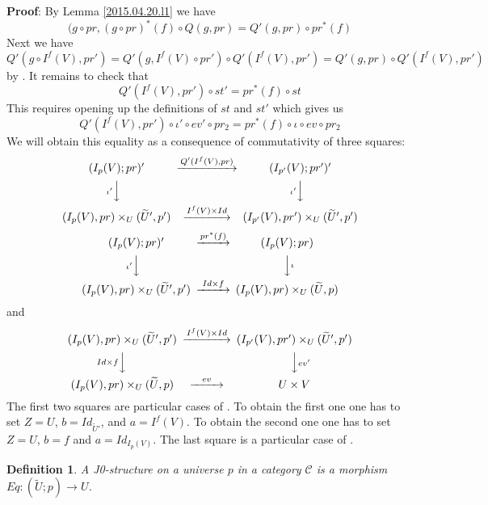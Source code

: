 \documentclass[12pt]{article}
\newenvironment{myproof}{{\bf Proof}:}{\vskip 5mm }
\newtheorem{definition}[proposition]{Definition}
\newcommand{\llabel}[1]{\label{#1}}
\newcommand{\sr}{\rightarrow}
\newcommand{\wt}{\widetilde}
\begin{document}
\begin{myproof}
By Lemma \ref{2015.04.20.l1} we have 
%
$$(g\circ pr, (g\circ pr)^*(f)\circ Q(g,pr)=Q'(g,pr)\circ pr^*(f)$$
%
Next we have
%
$$Q'(g\circ I^f(V), pr')=Q'(g,I^f(V)\circ pr')\circ Q'(I^f(V),pr')=Q'(g,pr)\circ Q'(I^f(V),pr')$$
%
by \cite[Lemma 3.2]{fromunivwithPi}. It remains to check that
%
$$Q'(I^f(V),pr')\circ st'=pr^*(f)\circ st$$
%
This requires opening up the definitions of $st$ and $st'$ which gives us
%
$$Q'(I^f(V),pr')\circ \iota'\circ ev'\circ pr_2=pr^*(f)\circ \iota\circ ev\circ pr_2$$
%
We will obtain this equality as a consequence of commutativity of three squares:
%
$$
\begin{CD}
(I_p(V);pr)' @>Q'(I^f(V),pr)>> (I_{p'}(V);pr')'\\
@V\iota' VV @V\iota' VV\\
(I_p(V),pr)\times_U(\wt{U}',p') @>I^f(V)\times Id>> (I_{p'}(V),pr')\times_U(\wt{U}',p')
\end{CD}
$$
%
$$
\begin{CD}
(I_p(V);pr)'  @>pr^*(f)>> (I_p(V);pr)\\
@V\iota' VV @VV\iota V\\
(I_p(V),pr)\times_U(\wt{U}',p') @>Id\times f >> (I_p(V),pr)\times_U(\wt{U},p)
\end{CD}
$$
%
and
%
$$
\begin{CD}
(I_p(V),pr)\times_U(\wt{U}',p') @>I^f(V)\times Id >> (I_{p'}(V),pr')\times_U(\wt{U}',p')\\
@VId\times f VV @VV {ev'}V\\
(I_p(V),pr)\times_U(\wt{U},p) @>ev>> U\times V
\end{CD}
$$
%
The first two squares are particular cases of \cite[Lemma 8.1]{fromunivwithPi}. To obtain the first one one has to set $Z=U$, $b=Id_{\wt{U}'}$, and $a=I^f(V)$. To obtain the second one one has to set $Z=U$, $b=f$ and $a=Id_{I_p(V)}$. The last square is a particular case of \cite[Lemma 8.6]{fromunivwithPi}.
%
\end{myproof}
%
\begin{definition}
\llabel{2015.03.27.def4}
A J0-structure on a universe $p$ in a category $\mathcal C$ is a morphism $Eq:(\wt{U};p)\sr U$.
\end{definition}
%
\end{document}
